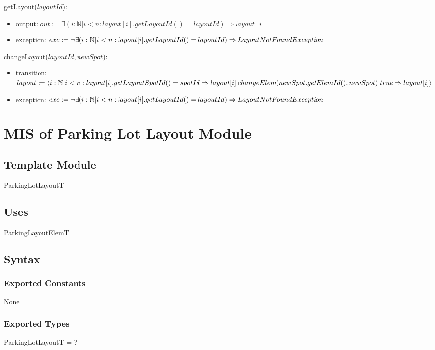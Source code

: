 \documentclass[12pt, titlepage]{article}
\begin{document}
\noindent getLayout($layoutId$):
\begin{itemize} 
\item output: $out := \exists (i:\mathbb{N}|i < n : layout[i].getLayoutId() =
layoutId) \Rightarrow layout[i]$
\item exception: $exc := \neg \exists (i:\mathbb{N}|i < n :
layout[i].getLayoutId() = layoutId) \Rightarrow \\ LayoutNotFoundException$
\end{itemize}

\noindent changeLayout($layoutId, newSpot$):
\begin{itemize} 
\item transition: $layout := \langle i:\mathbb{N} | i < n :
layout[i].getLayoutSpotId() = spotId \Rightarrow \\
layout[i].changeElem(newSpot.getElemId(), newSpot) | true \Rightarrow layout[i]
\rangle$
\item exception: $exc := \neg \exists (i:\mathbb{N}|i < n :
layout[i].getLayoutId() = layoutId) \Rightarrow \\ LayoutNotFoundException$
\end{itemize}

\newpage

\section{MIS of Parking Lot Layout Module} 
\label{parkingLotLayout:Module}

\subsection{Template Module}
ParkingLotLayoutT

\subsection{Uses}
\hyperref[parkingLayoutElem:Module]{ParkingLayoutElemT}

\subsection{Syntax}

\subsubsection{Exported Constants}
None

\subsubsection{Exported Types}
ParkingLotLayoutT = ?
\end{document}
